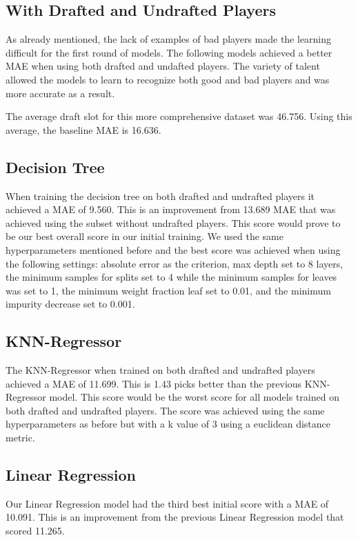 \documentclass{article}
\begin{document}
\subsection{With Drafted and Undrafted Players}

As already mentioned, the lack of examples of bad players made the learning
difficult for the first round of models. The following models achieved a better
MAE when using both drafted and undafted players. The variety of talent allowed
the models to learn to recognize both good and bad players and was more accurate
as a result.

The average draft slot for this more comprehensive dataset was 46.756. Using
this average, the baseline MAE is 16.636.

\subsection{Decision Tree}

When training the decision tree on both drafted and undrafted players it
achieved a MAE of 9.560. This is an improvement from 13.689 MAE that was
achieved using the subset without undrafted players. This score would prove to
be our best overall score in our initial training. We used the same
hyperparameters mentioned before and the best score was achieved when using the
following settings: absolute error as the criterion, max depth set to 8 layers,
the minimum samples for splits set to 4 while the minimum samples for leaves was
set to 1, the minimum weight fraction leaf set to 0.01, and the minimum impurity
decrease set to 0.001.

\subsection{KNN-Regressor}

The KNN-Regressor when trained on both drafted and undrafted players achieved a
MAE of 11.699. This is 1.43 picks better than the previous KNN-Regressor model.
This score would be the worst score for all models trained on both drafted and
undrafted players. The score was achieved using the same hyperparameters as
before but with a k value of 3 using a euclidean distance metric.

\subsection{Linear Regression}

Our Linear Regression model had the third best initial score with a MAE of
10.091. This is an improvement from the previous Linear Regression model that
scored 11.265.
\end{document}
